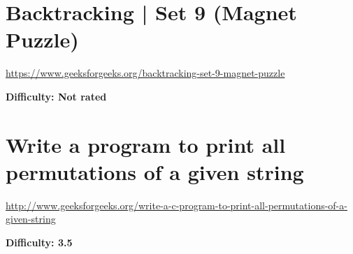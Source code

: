 
\section{Backtracking | Set 9 (Magnet Puzzle)
  \label{secGFGBktrckSet9MagnetPuzz}}

\url{https://www.geeksforgeeks.org/backtracking-set-9-magnet-puzzle}

\textbf{Difficulty: Not rated}

\textbf{}

\RayNotesBegin



\RayNotesEnd

\textbf{}








\section{Write a program to print all permutations of a given string
  \label{secGFGBktrckPrintAllPermuOfString}}

\url{http://www.geeksforgeeks.org/write-a-c-program-to-print-all-permutations-of-a-given-string}

\textbf{Difficulty: 3.5}

\textbf{}

\RayNotesBegin



\RayNotesEnd

\textbf{}







